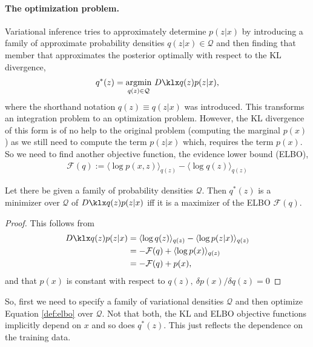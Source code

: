 \paragraph{The optimization problem.}  Variational inference tries to approximately determine  $p(z|x)$ by introducing a family of approximate probability densities $q(z|x) \in \mathcal Q$ and then finding that member that approximates the posterior optimally with respect to the KL divergence, 
\begin{align}
	q^*(z) = \underset{q(z)\in \mathcal Q}{\mathrm{arg min}} 
	~ \kl{q(z)}{p(z|x)}, 
\end{align} 
where the shorthand notation $q(z) \equiv q(z|x)$ was introduced.
This transforms an integration problem to an optimization problem. However, the KL divergence of this form is  of no help to the original problem (computing the marginal $p(x)$) as we still need to compute the term $p(z|x)$ which, requires the term $p(x)$. So we need to find another objective function, the evidence lower bound (ELBO), 
\begin{align} \label{def:elbo}
	\mathcal{F}(q):= \langle \log p(x,z) \rangle _{q(z)} - \langle \log q(z) \rangle _{q(z)}
\end{align}
\begin{theorem}\label{thm:elbo_kl}Let there be given a family of probability densities $\mathcal Q$. Then $q^*(z)$ is a minimizer over $\mathcal Q$ of $\kl{q(z)}{p(z|x)}$ iff it is a maximizer of the ELBO $\mathcal{F}(q)$. 
\end{theorem}
\begin{proof}This follows from
	\begin{align*}
		\kl{q(z)}{p(z|x)}   &=  \langle \log q(z) \rangle _{q(z)} - \langle \log p(z | x) \rangle _{q(z)}   \\     
		  &= - \mathcal{F}(q) + \langle \log p(x) \rangle _{q(z)} \\
		  & = - \mathcal{F}(q)  + p(x), 
	\end{align*}
and that $p(x)$ is constant with respect to $q(z), ~ \delta p(x) / \delta q(z) = 0$
\end{proof}
So, first we need to specify a family of variational densities $\mathcal Q$ and then optimize Equation \ref{def:elbo} over $\mathcal Q$. Not that both, the KL and ELBO objective functions implicitly depend on $x$ and so does $q^*(z)$. This just reflects the dependence on the training data.
